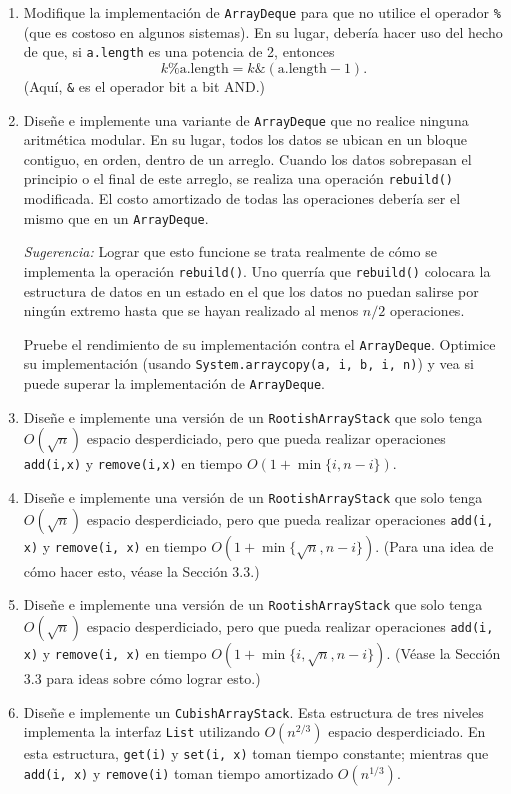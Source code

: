 \documentclass[11pt]{book}
\theoremstyle{plain}
\begin{document}
\begin{enumerate}[label=\textbf{Ejercicio 2.\arabic*.}, leftmargin=*, itemsep=8pt]
\item Modifique la implementación de \texttt{ArrayDeque} para que no utilice el operador \texttt{\%} (que es costoso en algunos sistemas). En su lugar, debería hacer uso del hecho de que, si \texttt{a.length} es una potencia de 2, entonces
$$
k\%\text{a.length} = k\&(\text{a.length} - 1) .
$$
(Aquí, \texttt{\&} es el operador bit a bit AND.)

\item Diseñe e implemente una variante de \texttt{ArrayDeque} que no realice ninguna aritmética modular. En su lugar, todos los datos se ubican en un bloque contiguo, en orden, dentro de un arreglo. Cuando los datos sobrepasan el principio o el final de este arreglo, se realiza una operación \texttt{rebuild()} modificada. El costo amortizado de todas las operaciones debería ser el mismo que en un \texttt{ArrayDeque}.

\emph{Sugerencia:} Lograr que esto funcione se trata realmente de cómo se implementa la operación \texttt{rebuild()}. Uno querría que \texttt{rebuild()} colocara la estructura de datos en un estado en el que los datos no puedan salirse por ningún extremo hasta que se hayan realizado al menos $n/2$ operaciones.

Pruebe el rendimiento de su implementación contra el \texttt{ArrayDeque}. Optimice su implementación (usando \texttt{System.arraycopy(a, i, b, i, n)}) y vea si puede superar la implementación de \texttt{ArrayDeque}.

\item Diseñe e implemente una versión de un \texttt{RootishArrayStack} que solo tenga $O(\sqrt{n})$ espacio desperdiciado, pero que pueda realizar operaciones \texttt{add(i,x)} y \texttt{remove(i,x)} en tiempo $O(1 + \min\{i, n - i\})$.

\item Diseñe e implemente una versión de un \texttt{RootishArrayStack} que solo tenga $O(\sqrt{n})$ espacio desperdiciado, pero que pueda realizar operaciones \texttt{add(i, x)} y \texttt{remove(i, x)} en tiempo $O(1 + \min\{\sqrt{n}, n - i\})$. (Para una idea de cómo hacer esto, véase la Sección 3.3.)

\item Diseñe e implemente una versión de un \texttt{RootishArrayStack} que solo tenga $O(\sqrt{n})$ espacio desperdiciado, pero que pueda realizar operaciones \texttt{add(i, x)} y \texttt{remove(i, x)} en tiempo $O(1 + \min\{i, \sqrt{n}, n - i\})$. (Véase la Sección 3.3 para ideas sobre cómo lograr esto.)

\item Diseñe e implemente un \texttt{CubishArrayStack}. Esta estructura de tres niveles implementa la interfaz \texttt{List} utilizando $O(n^{2/3})$ espacio desperdiciado. En esta estructura, \texttt{get(i)} y \texttt{set(i, x)} toman tiempo constante; mientras que \texttt{add(i, x)} y \texttt{remove(i)} toman tiempo amortizado $O(n^{1/3})$.

\end{enumerate}
\end{document}
